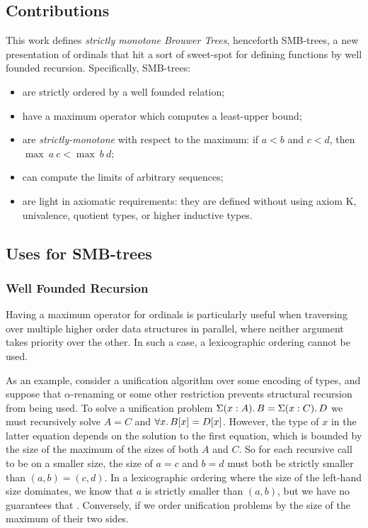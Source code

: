 \subsection{Contributions}

This work defines \textit{strictly monotone Brouwer Trees}, henceforth SMB-trees,
a new presentation of ordinals that hit a sort of sweet-spot for defining functions by
well founded recursion. Specifically, SMB-trees:

\begin{itemize}
  \item are strictly ordered by a well founded relation;
  \item have a maximum operator which computes a least-upper bound;
  \item are \textit{strictly-monotone} with respect to the maximum: if $a < b$ and $c < d$, then $\max\ a\ c < \max\ b\ d$;
  \item can compute the limits of arbitrary sequences;
  \item are light in axiomatic requirements: they are defined without using axiom K,
        univalence, quotient types, or higher inductive types.
\end{itemize}

\subsection{Uses for SMB-trees}

\subsubsection{Well Founded Recursion}

Having a maximum operator for ordinals is particularly useful when traversing over multiple higher order
data structures in parallel, where neither argument takes priority over the other.
In such a case, a lexicographic ordering cannot be used.

As an example, consider a unification algorithm over some encoding of types, and suppose that $\alpha$-renaming or some other restriction prevents
structural recursion from being used.
To solve a unification problem $ \Sigma(x : A)\ldotp B = \Sigma(x : C)\ldotp D$
we must recursively
solve $A = C$ and $\forall x \ldotp B[x] = D[x]$.
However, the type of $x$ in the latter equation depends on the solution
to the first equation, which is bounded by the size of the maximum of the sizes
of both $A$ and $C$.
So for each recursive call to be on a smaller size,
the size of $a = c$ and $b = d$ must both be strictly smaller than
$(a,b)=(c,d)$. In a lexicographic ordering where the size of the left-hand size
dominates, we know that $a$ is strictly smaller than $(a,b)$, but we have no
guarantees that .
Conversely, if we order unification problems by the size of the maximum of their
two sides.



